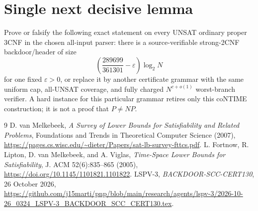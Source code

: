 \documentclass[11pt]{article}
\begin{document}
\section{Single next decisive lemma}

Prove or falsify the following exact statement on every UNSAT ordinary
proper 3CNF in the chosen all-input parser: there is a source-verifiable
strong-2CNF backdoor/header of size
\[
 \left(\frac{289699}{361301}-\varepsilon\right)\log_2N
\]
for one fixed $\varepsilon>0$, or replace it by another certificate grammar
with the same uniform cap, all-UNSAT coverage, and fully charged
$N^{c+o(1)}$ worst-branch verifier.  A hard instance for this particular
grammar retires only this coNTIME construction; it is not a proof that
$P\ne NP$.

\begin{thebibliography}{9}
D. van Melkebeek,
\emph{A Survey of Lower Bounds for Satisfiability and Related Problems},
Foundations and Trends in Theoretical Computer Science (2007),
\url{https://pages.cs.wisc.edu/~dieter/Papers/sat-lb-survey-fttcs.pdf}.
L. Fortnow, R. Lipton, D. van Melkebeek, and A. Viglas,
\emph{Time-Space Lower Bounds for Satisfiability},
J. ACM 52(6):835--865 (2005),
\url{https://doi.org/10.1145/1101821.1101822}.
LSPV-3, \emph{BACKDOOR-SCC-CERT130}, 26 October 2026,
\url{https://github.com/j15marti/pnp/blob/main/research/agents/lspv-3/2026-10-26_0324_LSPV-3_BACKDOOR_SCC_CERT130.tex}.
\end{thebibliography}

\end{document}
